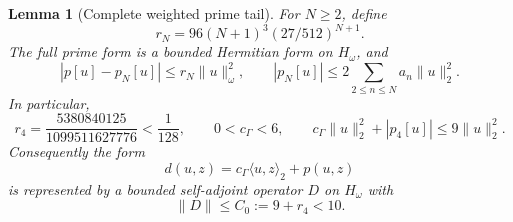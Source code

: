 \documentclass[11pt,a4paper]{article}
\numberwithin{equation}{section}
\newtheorem{lemma}[theorem]{Lemma}
\theoremstyle{remark}
\newcommand{\Hw}{H_\omega}
\newcommand{\cg}{c_{\Gamma}}
\newcommand{\ip}[2]{\langle #1,#2\rangle}
\newcommand{\norm}[1]{\lVert #1\rVert}
\begin{document}
\begin{lemma}[Complete weighted prime tail]\label{lem:prime}
For $N\ge2$, define
\begin{equation}\label{eq:rN}
 r_N=96(N+1)^3(27/512)^{N+1}.
\end{equation}
The full prime form is a bounded Hermitian form on $\Hw$, and
\begin{equation}\label{eq:headtail}
 |p[u]-p_N[u]|\le r_N\norm u_\omega^2,
 \qquad |p_N[u]|\le2\sum_{2\le n\le N}a_n\norm u_2^2.
\end{equation}
In particular,
\begin{equation}\label{eq:head4}
 r_4=\frac{5380840125}{1099511627776}<\frac1{128},
 \qquad 0<\cg<6,
 \qquad \cg\norm u_2^2+|p_4[u]|\le9\norm u_2^2.
\end{equation}
Consequently the form
\begin{equation}\label{eq:Dform}
 d(u,z)=\cg\ip uz_2+p(u,z)
\end{equation}
is represented by a bounded self-adjoint operator $D$ on $\Hw$ with
\begin{equation}\label{eq:C0}
 \norm D\le C_0:=9+r_4<10.
\end{equation}
\end{lemma}
\end{document}

